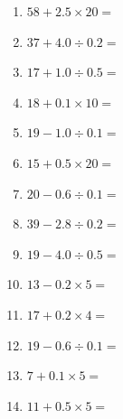 \documentclass[12pt]{article}
\begin{document}
\begin{enumerate}
\item \large $ 58 + 2.5 \times 20 = $ \vspace{1.6cm}
\item \large $ 37 + 4.0 \div 0.2 = $ \vspace{1.6cm}
\item \large $ 17 + 1.0 \div 0.5 = $ \vspace{1.6cm}
\item \large $ 18 + 0.1 \times 10 = $ \vspace{1.6cm}
\newpage
\item \large $ 19 - 1.0 \div 0.1 = $ \vspace{1.6cm}
\item \large $ 15 + 0.5 \times 20 = $ \vspace{1.6cm}
\item \large $ 20 - 0.6 \div 0.1 = $ \vspace{1.6cm}
\item \large $ 39 - 2.8 \div 0.2 = $ \vspace{1.6cm}
\item \large $ 19 - 4.0 \div 0.5 = $ \vspace{1.6cm}
\item \large $ 13 - 0.2 \times 5 = $ \vspace{1.6cm}
\item \large $ 17 + 0.2 \times 4 = $ \vspace{1.6cm}
\item \large $ 19 - 0.6 \div 0.1 = $ \vspace{1.6cm}
\item \large $ 7 + 0.1 \times 5 = $ \vspace{1.6cm}
\item \large $ 11 + 0.5 \times 5 = $ \vspace{1.6cm}
\end{enumerate}
\newpage
\end{document}
